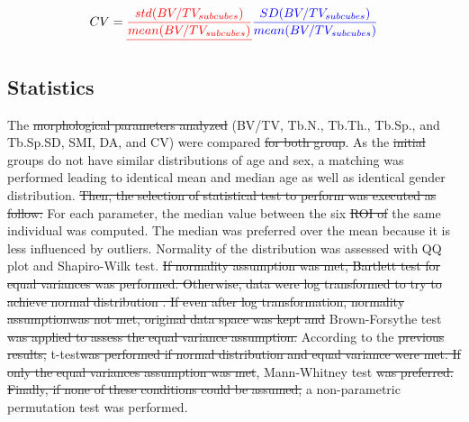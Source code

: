 \documentclass[a4paper,fleqn]{DC_ArtStyle}
\providecommand{\DIFadd}[1]{{\protect\color{blue}{#1}}} %
\providecommand{\DIFdel}[1]{{\protect\color{red}\sout{#1}}}                      %
\providecommand{\DIFaddbegin}{} %
\providecommand{\DIFaddend}{} %
\providecommand{\DIFdelbegin}{} %
\providecommand{\DIFdelend}{} %
\begin{document}
\begin{equation}
	CV = \DIFdelbegin \DIFdel{\frac{std(BV/TV_{subcubes})}{mean(BV/TV_{subcubes})}
	}\DIFdelend \DIFaddbegin \DIFadd{\frac{SD(BV/TV_{subcubes})}{mean(BV/TV_{subcubes})}
	}\DIFaddend \label{Eq203}
\end{equation}

\subsection{Statistics}
The \DIFdelbegin \DIFdel{morphological parameters analyzed }\DIFdelend \DIFaddbegin \DIFadd{analyzed morphological parameters }\DIFaddend (BV/TV, Tb.N., Tb.Th., Tb.Sp., and Tb.Sp.SD, SMI, DA, and CV) were compared \DIFdelbegin \DIFdel{for both group}\DIFdelend \DIFaddbegin \DIFadd{between the healthy and the OI groups}\DIFaddend . As the \DIFdelbegin \DIFdel{initial }\DIFdelend groups do not have similar distributions of age and sex, a matching was performed \DIFaddbegin \DIFadd{by selecting similar individuals }\DIFaddend leading to identical mean and median age as well as identical gender distribution. \DIFdelbegin \DIFdel{Then, the selection of statistical test to perform was executed as follow:
}%
\DIFdelend For each parameter, the median value between the six \DIFdelbegin \DIFdel{ROI of }\DIFdelend \DIFaddbegin \DIFadd{ROIs from }\DIFaddend the same individual was computed. The median was preferred over the mean because it is less influenced by outliers. \DIFdelbegin %
\DIFdelend Normality of the distribution was assessed with QQ plot and Shapiro-Wilk test. \DIFdelbegin %
\DIFdel{If normality assumption was met, Bartlett test for equal variances was performed. Otherwise, data were log transformed to try to achieve normal distribution . If even after log transformation, normality assumptionwas not met, original data space was kept and }\DIFdelend \DIFaddbegin \DIFadd{CV had to be log-transformed to meet normal distribution assumption. Then, equal variances was assessed using Bartlett test or }\DIFaddend Brown-Forsythe test \DIFdelbegin \DIFdel{was applied to assess the equal variance assumption. }%
\DIFdelend \DIFaddbegin \DIFadd{according to the normality distribution of the data. }\DIFaddend According to the \DIFdelbegin \DIFdel{previous results, }\DIFdelend \DIFaddbegin \DIFadd{normality and equal variances assumptions, }\DIFaddend t-test\DIFdelbegin \DIFdel{was performed if normal distribution and equal variance were met. If only the equal variances assumption was met}\DIFdelend , Mann-Whitney test \DIFdelbegin \DIFdel{was preferred. Finally, if none of these conditions could be assumed, }\DIFdelend \DIFaddbegin \DIFadd{or }\DIFaddend a non-parametric permutation test was performed. \DIFdelbegin %
\end{document}
